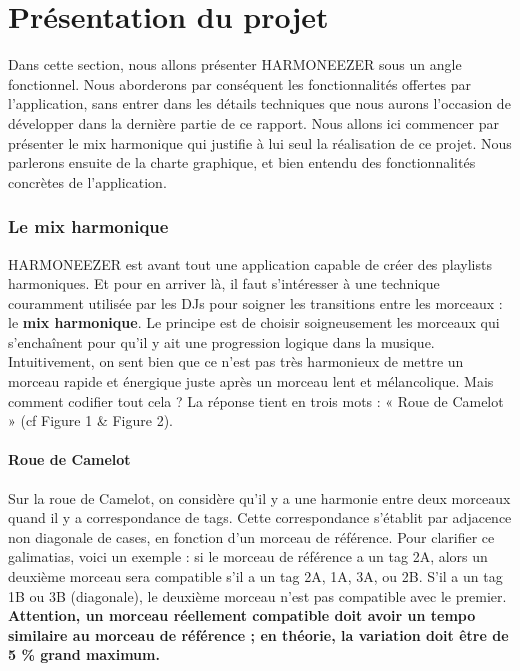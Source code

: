 \documentclass[a4paper,12pt]{article}
\begin{document}
\part{Présentation du projet}

Dans cette section, nous allons présenter HARMONEEZER sous un angle fonctionnel. Nous aborderons par conséquent les fonctionnalités offertes par l'application, sans entrer dans les détails techniques que nous aurons l'occasion de développer dans la dernière partie de ce rapport. Nous allons ici commencer par présenter le mix harmonique qui justifie à lui seul la réalisation de ce projet. Nous parlerons ensuite de la charte graphique, et bien entendu des fonctionnalités concrètes de l'application.

\section{Le mix harmonique}

HARMONEEZER est avant tout une application capable de créer des playlists harmoniques. Et pour en arriver là, il faut s'intéresser à une technique couramment utilisée par les DJs pour soigner les transitions entre les morceaux : le \textbf{mix harmonique}. Le principe est de choisir soigneusement les morceaux qui s'enchaînent pour qu'il y ait une progression logique dans la musique. Intuitivement, on sent bien que ce n'est pas très harmonieux de mettre un morceau rapide et énergique juste après un morceau lent et mélancolique. Mais comment codifier tout cela ? La réponse tient en trois mots : « Roue de Camelot » (cf Figure 1 \& Figure 2).

\subsection{Roue de Camelot}

Sur la roue de Camelot, on considère qu'il y a une harmonie entre deux morceaux quand il y a correspondance de tags. Cette correspondance s'établit par adjacence non diagonale de cases, en fonction d'un morceau de référence. Pour clarifier ce galimatias, voici un exemple : si le morceau de référence a un tag 2A, alors un deuxième morceau sera compatible s'il a un tag 2A, 1A, 3A, ou 2B. S'il a un tag 1B ou 3B (diagonale), le deuxième morceau n'est pas compatible avec le premier. \textbf{Attention, un morceau réellement compatible doit avoir un tempo similaire au morceau de référence ; en théorie, la variation doit être de 5 \% grand maximum.}
\end{document}
